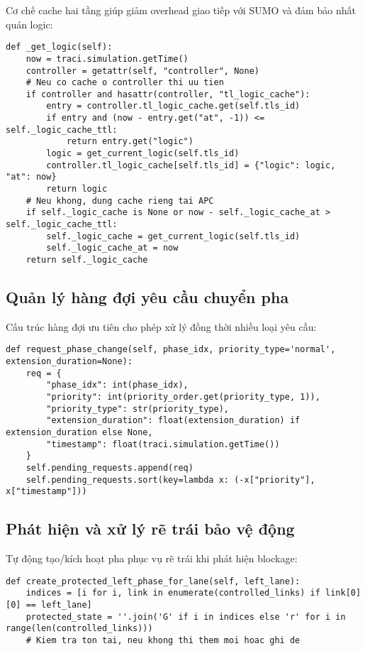 Cơ chế cache hai tầng giúp giảm overhead giao tiếp với SUMO và đảm bảo nhất quán logic:
\begin{lstlisting}[style=py,caption={Lấy logic pha với cache}]
def _get_logic(self):
    now = traci.simulation.getTime()
    controller = getattr(self, "controller", None)
    # Neu co cache o controller thi uu tien
    if controller and hasattr(controller, "tl_logic_cache"):
        entry = controller.tl_logic_cache.get(self.tls_id)
        if entry and (now - entry.get("at", -1)) <= self._logic_cache_ttl:
            return entry.get("logic")
        logic = get_current_logic(self.tls_id)
        controller.tl_logic_cache[self.tls_id] = {"logic": logic, "at": now}
        return logic
    # Neu khong, dung cache rieng tai APC
    if self._logic_cache is None or now - self._logic_cache_at > self._logic_cache_ttl:
        self._logic_cache = get_current_logic(self.tls_id)
        self._logic_cache_at = now
    return self._logic_cache
\end{lstlisting}

\subsection{Quản lý hàng đợi yêu cầu chuyển pha}

Cấu trúc hàng đợi ưu tiên cho phép xử lý đồng thời nhiều loại yêu cầu:
\begin{lstlisting}[style=py,caption={Thêm yêu cầu vào hàng đợi}]
def request_phase_change(self, phase_idx, priority_type='normal', extension_duration=None):
    req = {
        "phase_idx": int(phase_idx),
        "priority": int(priority_order.get(priority_type, 1)),
        "priority_type": str(priority_type),
        "extension_duration": float(extension_duration) if extension_duration else None,
        "timestamp": float(traci.simulation.getTime())
    }
    self.pending_requests.append(req)
    self.pending_requests.sort(key=lambda x: (-x["priority"], x["timestamp"]))
\end{lstlisting}

\subsection{Phát hiện và xử lý rẽ trái bảo vệ động}

Tự động tạo/kích hoạt pha phục vụ rẽ trái khi phát hiện blockage:
\begin{lstlisting}[style=py,caption={Tạo pha protected left động}]
def create_protected_left_phase_for_lane(self, left_lane):
    indices = [i for i, link in enumerate(controlled_links) if link[0][0] == left_lane]
    protected_state = ''.join('G' if i in indices else 'r' for i in range(len(controlled_links)))
    # Kiem tra ton tai, neu khong thi them moi hoac ghi de
\end{lstlisting}

